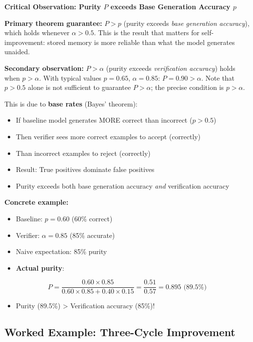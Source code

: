 \documentclass[12pt,a4paper]{article}
\theoremstyle{definition}
\begin{document}
\begin{keyinsightbox}
\textbf{Critical Observation: Purity $P$ exceeds Base Generation Accuracy $p$}

\textbf{Primary theorem guarantee:} $P > p$ (purity exceeds \emph{base generation accuracy}), which holds whenever $\alpha > 0.5$. This is the result that matters for self-improvement: stored memory is more reliable than what the model generates unaided.

\textbf{Secondary observation:} $P > \alpha$ (purity exceeds \emph{verification accuracy}) holds when $p > \alpha$. With typical values $p = 0.65$, $\alpha = 0.85$: $P = 0.90 > \alpha$. Note that $p > 0.5$ alone is not sufficient to guarantee $P > \alpha$; the precise condition is $p > \alpha$.

This is due to \textbf{base rates} (Bayes' theorem):
\begin{itemize}
    \item If baseline model generates MORE correct than incorrect ($p > 0.5$)
    \item Then verifier sees more correct examples to accept (correctly)
    \item Than incorrect examples to reject (correctly)
    \item Result: True positives dominate false positives
    \item Purity exceeds both base generation accuracy \emph{and} verification accuracy
\end{itemize}

\textbf{Concrete example:}
\begin{itemize}
    \item Baseline: $p = 0.60$ (60\% correct)
    \item Verifier: $\alpha = 0.85$ (85\% accurate)
    \item Naive expectation: 85\% purity
    \item \textbf{Actual purity}: 
\end{itemize}
\begin{equation}
P = \frac{0.60 \times 0.85}{0.60 \times 0.85 + 0.40 \times 0.15} = \frac{0.51}{0.57} = 0.895 \text{ (89.5\%)}
\end{equation}
\begin{itemize}
    \item Purity (89.5\%) > Verification accuracy (85\%)!
\end{itemize}
\end{keyinsightbox}

\subsection{Worked Example: Three-Cycle Improvement}
\end{document}
